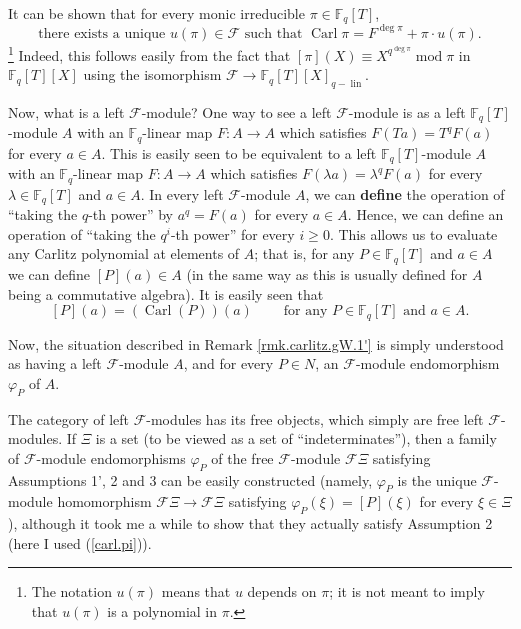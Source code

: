 \documentclass[numbers=enddot,12pt,final,onecolumn,notitlepage]{scrartcl}%
\theoremstyle{definition}
\begin{document}
It can be shown that for every monic irreducible $\pi\in\mathbb{F}_{q}\left[
T\right]  $,%
\begin{equation}
\text{there exists a unique }u\left(  \pi\right)  \in\mathcal{F}\text{ such
that }\operatorname*{Carl}\pi=F^{\deg\pi}+\pi\cdot u\left(  \pi\right)  .
\label{carl.pi}%
\end{equation}
\footnote{The notation $u\left(  \pi\right)  $ means that $u$ depends on $\pi
$; it is not meant to imply that $u\left(  \pi\right)  $ is a polynomial in
$\pi$.} Indeed, this follows easily from the fact that $\left[  \pi\right]
\left(  X\right)  \equiv X^{q^{\deg\pi}}\operatorname{mod}\pi$ in
$\mathbb{F}_{q}\left[  T\right]  \left[  X\right]  $ using the isomorphism
$\mathcal{F}\rightarrow\mathbb{F}_{q}\left[  T\right]  \left[  X\right]
_{q-\operatorname*{lin}}$.

Now, what is a left $\mathcal{F}$-module? One way to see a left $\mathcal{F}%
$-module is as a left $\mathbb{F}_{q}\left[  T\right]  $-module $A$ with an
$\mathbb{F}_{q}$-linear map $F:A\rightarrow A$ which satisfies $F\left(
Ta\right)  =T^{q}F\left(  a\right)  $ for every $a\in A$. This is easily seen
to be equivalent to a left $\mathbb{F}_{q}\left[  T\right]  $-module $A$ with
an $\mathbb{F}_{q}$-linear map $F:A\rightarrow A$ which satisfies $F\left(
\lambda a\right)  =\lambda^{q}F\left(  a\right)  $ for every $\lambda
\in\mathbb{F}_{q}\left[  T\right]  $ and $a\in A$. In every left $\mathcal{F}%
$-module $A$, we can \textbf{define} the operation of ``taking the $q$-th
power'' by $a^{q}=F\left(  a\right)  $ for every $a\in A$. Hence, we can
define an operation of ``taking the $q^{i}$-th power'' for every $i\geq0$.
This allows us to evaluate any Carlitz polynomial at elements of $A$; that is,
for any $P\in\mathbb{F}_{q}\left[  T\right]  $ and $a\in A$ we can define
$\left[  P\right]  \left(  a\right)  \in A$ (in the same way as this is
usually defined for $A$ being a commutative algebra). It is easily seen that%
\[
\left[  P\right]  \left(  a\right)  =\left(  \operatorname*{Carl}\left(
P\right)  \right)  \left(  a\right)  \ \ \ \ \ \ \ \ \ \ \text{for any }%
P\in\mathbb{F}_{q}\left[  T\right]  \text{ and }a\in A.
\]


Now, the situation described in Remark \ref{rmk.carlitz.gW.1'} is simply
understood as having a left $\mathcal{F}$-module $A$, and for every $P\in N$,
an $\mathcal{F}$-module endomorphism $\varphi_{P}$ of $A$.

The category of left $\mathcal{F}$-modules has its free objects, which simply
are free left $\mathcal{F}$-modules. If $\Xi$ is a set (to be viewed as a set
of ``indeterminates''), then a family of $\mathcal{F}$-module endomorphisms
$\varphi_{P}$ of the free $\mathcal{F}$-module $\mathcal{F}\Xi$ satisfying
Assumptions 1', 2 and 3 can be easily constructed (namely, $\varphi_{P}$ is
the unique $\mathcal{F}$-module homomorphism $\mathcal{F}\Xi\rightarrow
\mathcal{F}\Xi$ satisfying $\varphi_{P}\left(  \xi\right)  =\left[  P\right]
\left(  \xi\right)  $ for every $\xi\in\Xi$), although it took me a while to
show that they actually satisfy Assumption 2 (here I used (\ref{carl.pi})).
\end{document}
